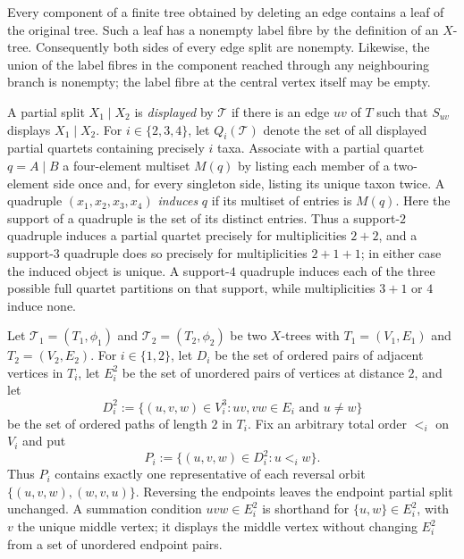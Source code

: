 \documentclass[pdflatex,sn-mathphys-num]{sn-jnl}
\theoremstyle{thmstyleone}
\begin{document}
Every component of a finite tree obtained by deleting an edge contains a
leaf of the original tree.  Such a leaf has a nonempty label fibre by the
definition of an $X$-tree.  Consequently both sides of every edge split are
nonempty.  Likewise, the union of the label fibres in the component reached
through any neighbouring branch is nonempty; the label fibre at the central
vertex itself may be empty.

A partial split $X_1\mid X_2$ is \emph{displayed} by $\mathcal T$ if
there is an edge $uv$ of $T$ such that $S_{uv}$ displays
$X_1\mid X_2$.  For $i\in\{2,3,4\}$, let $Q_i(\mathcal T)$ denote the
set of all displayed partial quartets containing precisely $i$ taxa.
Associate with a partial quartet $q=A\mid B$ a four-element multiset
$M(q)$ by listing each member of a two-element side once and, for every
singleton side, listing its unique taxon twice.  A quadruple
$(x_1,x_2,x_3,x_4)$ \emph{induces} $q$ if its multiset of entries is
$M(q)$.  Here the support of a quadruple is the set of its distinct entries.
Thus a support-$2$ quadruple induces a partial quartet precisely
for multiplicities $2+2$, and a support-$3$ quadruple does so precisely for
multiplicities $2+1+1$; in either case the induced object is unique.  A
support-$4$ quadruple induces each of the three possible full quartet
partitions on that support, while multiplicities $3+1$ or $4$ induce none.

Let $\mathcal T_1=(T_1,\phi_1)$ and
$\mathcal T_2=(T_2,\phi_2)$ be two $X$-trees with
$T_1=(V_1,E_1)$ and $T_2=(V_2,E_2)$.  For $i\in\{1,2\}$, let $D_i$
be the set of ordered pairs of adjacent vertices in $T_i$, let $E_i^2$
be the set of unordered pairs of vertices at distance $2$, and let
\[
 D_i^2:=\{(u,v,w)\in V_i^3:uv,vw\in E_i\text{ and }u\ne w\}
\]
be the set of ordered paths of length $2$ in $T_i$.  Fix an arbitrary total
order $<_i$ on $V_i$ and put
\[
 P_i:=\{(u,v,w)\in D_i^2:u<_i w\}.
\]
Thus $P_i$ contains exactly one representative of each reversal orbit
$\{(u,v,w),(w,v,u)\}$.  Reversing the endpoints leaves the endpoint partial
split unchanged.  A summation condition $uvw\in E_i^2$ is shorthand for
$\{u,w\}\in E_i^2$, with $v$ the unique middle vertex; it displays the middle
vertex without changing $E_i^2$ from a set of unordered endpoint pairs.
\end{document}
